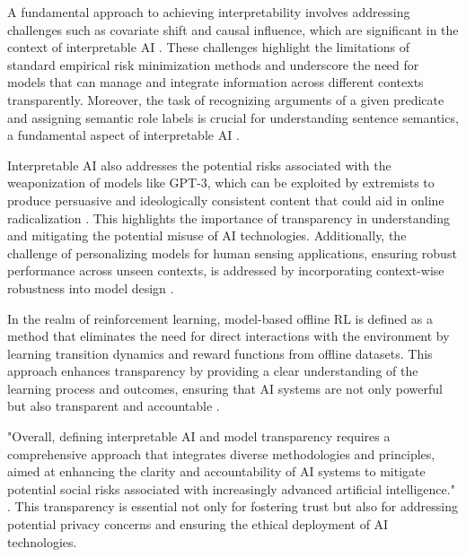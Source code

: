 A fundamental approach to achieving interpretability involves addressing challenges such as covariate shift and causal influence, which are significant in the context of interpretable AI \cite{sen2018supervisingfeatureinfluence}. These challenges highlight the limitations of standard empirical risk minimization methods and underscore the need for models that can manage and integrate information across different contexts transparently. Moreover, the task of recognizing arguments of a given predicate and assigning semantic role labels is crucial for understanding sentence semantics, a fundamental aspect of interpretable AI \cite{yamshchikov2020styletransferparaphraselookingsensible}.



Interpretable AI also addresses the potential risks associated with the weaponization of models like GPT-3, which can be exploited by extremists to produce persuasive and ideologically consistent content that could aid in online radicalization \cite{mcguffie2020radicalizationrisksgpt3advanced}. This highlights the importance of transparency in understanding and mitigating the potential misuse of AI technologies. Additionally, the challenge of personalizing models for human sensing applications, ensuring robust performance across unseen contexts, is addressed by incorporating context-wise robustness into model design \cite{kaur2024cropcontextwiserobuststatic}.



In the realm of reinforcement learning, model-based offline RL is defined as a method that eliminates the need for direct interactions with the environment by learning transition dynamics and reward functions from offline datasets. This approach enhances transparency by providing a clear understanding of the learning process and outcomes, ensuring that AI systems are not only powerful but also transparent and accountable \cite{lin2023interpretabilityframeworksimilarcase}.



"Overall, defining interpretable AI and model transparency requires a comprehensive approach that integrates diverse methodologies and principles, aimed at enhancing the clarity and accountability of AI systems to mitigate potential social risks associated with increasingly advanced artificial intelligence." \cite{lin2023interpretabilityframeworksimilarcase}. This transparency is essential not only for fostering trust but also for addressing potential privacy concerns and ensuring the ethical deployment of AI technologies.



